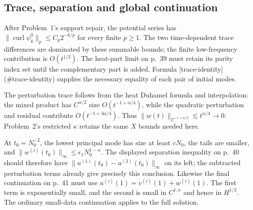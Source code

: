 \documentclass[10pt]{article}
\begin{document}
\subsection*{Trace, separation and global continuation}
After Problem 1’s support repair, the potential series has \(\|\operatorname{curl}\psi_k^0\|_p\leq C_p2^{-k/p}\) for every finite \(p\geq1\). The two time-dependent trace differences are dominated by these summable bounds; the finite low-frequency contribution is \(O(t^{1/2})\). The heat-part limit on p. 39 must retain its parity index set until the complementary part is added. Formula [trace-identity] (\#trace-identity) supplies the necessary equality of each pair of initial modes.\par
The perturbation trace follows from the heat Duhamel formula and interpolation: the mixed product has \(C^{\alpha/2}\) size \(O(t^{-1+\alpha/4})\), while the quadratic perturbation and residual contribute \(O(t^{-1+3\alpha/4})\). Thus \(\|w(t)\|_{\mathcal C^{-1+\alpha/2}}\lesssim t^{\alpha/4}\to0\). Problem 2’s restricted \(\kappa\) retains the same \(X\) bounds needed here.\par
At \(t_0=N_0^{-2}\), the lowest principal mode has size at least \(cN_0\), the tails are smaller, and \(\|w^{(i)}(t_0)\|_\infty\leq\epsilon_1N_0^{1-\alpha}\). The displayed separation inequality on p. 40 should therefore have \(\|u^{(1)}(t_0)-u^{(2)}(t_0)\|_\infty\) on its left; the subtracted perturbation terms already give precisely this conclusion. Likewise the final continuation on p. 41 must use \(u^{(i)}(1)=v^{(i)}(1)+w^{(i)}(1)\). The first term is exponentially small, and the second is small in \(C^{1,\kappa}\) and hence in \(H^{1/2}\). The ordinary small-data continuation applies to the full solution.\par
\end{document}
